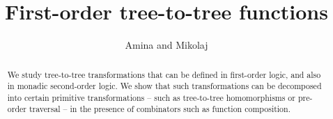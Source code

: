 \documentclass[sigplan,10pt,manonymous]{acmart}\settopmatter{printfolios=true,printccs=false,printacmref=false}
\begin{document}
 \title{First-order tree-to-tree functions}
 \author{Amina and Mikolaj}
 \begin{abstract}
    We study tree-to-tree transformations that can be defined in first-order logic, and also in monadic second-order logic. We show that such transformations can be decomposed into certain primitive transformations -- such as tree-to-tree homomorphisms or pre-order traversal -- in the presence of combinators such as function composition. 
\end{abstract}

 \maketitle






%


%

% 
%






\appendix






% 
\end{document}
